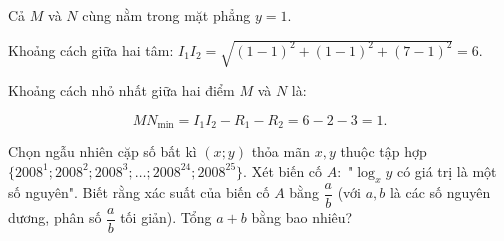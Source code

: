 \begin{ex}
{\begin{center}
		\end{center}
		Cả $M$ và $N$ cùng nằm trong mặt phẳng $y=1$. 
		
		Khoảng cách giữa hai tâm: 			
		$I_1I_2 = \sqrt{(1-1)^2 + (1-1)^2 + (7-1)^2} = 6$.
		
		Khoảng cách nhỏ nhất giữa hai điểm $M$ và $N$ là:
		
		$$MN_{\min} = I_1I_2 - R_1 - R_2 = 6 - 2 - 3 = 1.$$
		
	}
\end{ex}

\begin{ex}%
	Chọn ngẫu nhiên cặp số bất kì $(x; y)$ thỏa mãn $x, y$ thuộc tập hợp\\ $\{2008^1; 2008^2; 2008^3; \dots; 2008^{24}; 2008^{25}\}$. Xét biến cố $A \colon$ "$\log_x y$ có giá trị là một số nguyên". Biết rằng xác suất của biến cố $A$ bằng $\dfrac{a}{b}$ (với $a, b$ là các số nguyên dương, phân số $\dfrac{a}{b}$ tối giản). Tổng $a + b$ bằng bao nhiêu?
\end{ex}
